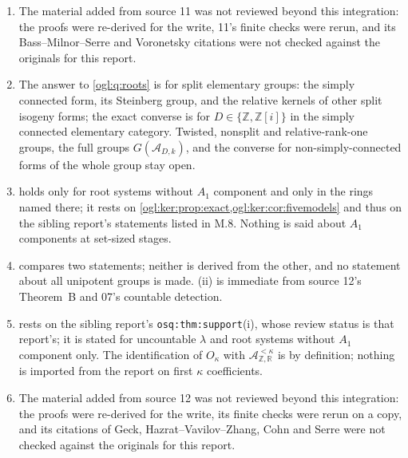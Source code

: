 \documentclass[11pt,oneside]{article}
\numberwithin{equation}{section}
\theoremstyle{definition}
\theoremstyle{remark}
\newcommand{\Z}{\mathbb Z}
\newcommand{\R}{\mathbb R}
\newcommand{\A}{\mathcal A}
\newcommand{\replabel}[1]{\nolinkurl{#1}}
\begin{document}
\begin{enumerate}[leftmargin=*,widest=00,label=M.\arabic*]
statements, not a new proof of either.
\item The material added from source 11 was not reviewed beyond this
integration: the proofs were re-derived for the write, 11's finite checks were
rerun, and its Bass--Milnor--Serre and Voronetsky citations were not checked
against the originals for this report.
\item The answer to \cref{ogl:q:roots} is for split elementary groups: the
simply connected form, its Steinberg group, and the relative kernels of other
split isogeny forms; the exact converse is for $D\in\{\Z,\Z[i]\}$ in the simply
connected elementary category. Twisted, nonsplit and relative-rank-one groups,
the full groups $G(\A_{D,k})$, and the converse for non-simply-connected forms
of the whole group stay open.
\item {} holds only for root systems without $A_1$
component and only in the rings named there; it rests on
\cref{ogl:ker:prop:exact,ogl:ker:cor:fivemodels} and thus on the sibling
report's statements listed in M.8. Nothing is said about $A_1$ components at
set-sized stages.
\item {} compares two statements; neither is derived
from the other, and no statement about all unipotent groups is made.
(ii) is immediate from source 12's Theorem~B and
07's countable detection.
\item {} rests on the sibling report's
\replabel{osq:thm:support}(i), whose review status is that report's; it is
stated for uncountable $\lambda$ and root systems without $A_1$ component only.
The identification of $O_\kappa$ with $\A^{<\kappa}_{\Z,\R}$ is by definition;
nothing is imported from the report on first $\kappa$ coefficients.
\item The material added from source 12 was not reviewed beyond this
integration: the proofs were re-derived for the write, its finite checks were
rerun on a copy, and its citations of Geck, Hazrat--Vavilov--Zhang, Cohn and
Serre were not checked against the originals for this report.
\end{enumerate}
\end{document}
